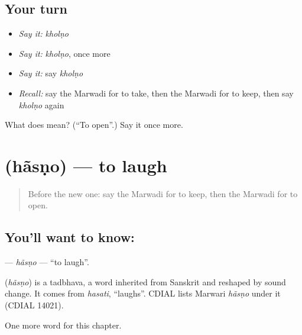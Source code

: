\subsection*{Your turn}
\begin{itemize}
\raggedright
  \item \emph{Say it:} \emph{kholṇo}
  \item \emph{Say it:} \emph{kholṇo}, once more
  \item \emph{Say it:} say \emph{kholṇo}
  \item \emph{Recall:} say the Marwadi for to take, then the Marwadi for to keep, then say \emph{kholṇo} again
\end{itemize}

\begin{tcolorbox}[breakable,colback=teal!4,colframe=teal!35!black,title={Before you move on}]
What does  mean? (\textquotedblleft{}To open\textquotedblright{}.) Say it once more.
\end{tcolorbox}
\section[\texorpdfstring{\mw{हंसणो} (hãsṇo)}{हंसणो (hãsṇo)}]{ (hãsṇo) — to laugh}

\label{lesson:MW-C54-hasno}



\begin{quote}
Before the new one: say the Marwadi for to keep, then the Marwadi for to open.
\end{quote}

\subsection*{You'll want to know: }
\textbf{} — \emph{hãsṇo} — \textquotedblleft{}to laugh\textquotedblright{}.

\begin{cousinweb}
\textbf{} (\emph{hãsṇo}) is a tadbhava, a word inherited from Sanskrit and reshaped by sound change. It comes from \emph{hasati}, \textquotedblleft{}laughs\textquotedblright{}. CDIAL lists Marwari \emph{hãsṇo} under it (CDIAL 14021).
\end{cousinweb}

\begin{grammarlens}[title={What you've built}]
One more word for this chapter.
\end{grammarlens}

